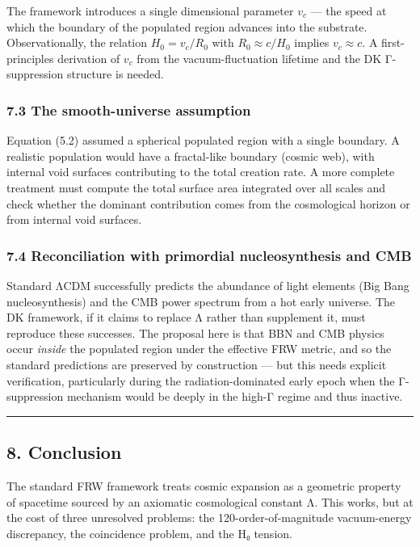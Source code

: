 \documentclass[
]{article}
\begin{document}
The framework introduces a single dimensional parameter \(v_c\) --- the
speed at which the boundary of the populated region advances into the
substrate. Observationally, the relation \(H_0 = v_c / R_0\) with
\(R_0 \approx c/H_0\) implies \(v_c \approx c\). A first-principles
derivation of \(v_c\) from the vacuum-fluctuation lifetime and the DK
Γ-suppression structure is needed.

\subsubsection{7.3 The smooth-universe
assumption}\label{the-smooth-universe-assumption}

Equation (5.2) assumed a spherical populated region with a single
boundary. A realistic population would have a fractal-like boundary
(cosmic web), with internal void surfaces contributing to the total
creation rate. A more complete treatment must compute the total surface
area integrated over all scales and check whether the dominant
contribution comes from the cosmological horizon or from internal void
surfaces.

\subsubsection{7.4 Reconciliation with primordial nucleosynthesis and
CMB}\label{reconciliation-with-primordial-nucleosynthesis-and-cmb}

Standard ΛCDM successfully predicts the abundance of light elements (Big
Bang nucleosynthesis) and the CMB power spectrum from a hot early
universe. The DK framework, if it claims to replace Λ rather than
supplement it, must reproduce these successes. The proposal here is that
BBN and CMB physics occur \emph{inside} the populated region under the
effective FRW metric, and so the standard predictions are preserved by
construction --- but this needs explicit verification, particularly
during the radiation-dominated early epoch when the Γ-suppression
mechanism would be deeply in the high-Γ regime and thus inactive.

\begin{center}\rule{0.5\linewidth}{0.5pt}\end{center}

\subsection{8. Conclusion}\label{conclusion}

The standard FRW framework treats cosmic expansion as a geometric
property of spacetime sourced by an axiomatic cosmological constant Λ.
This works, but at the cost of three unresolved problems: the
120-order-of-magnitude vacuum-energy discrepancy, the coincidence
problem, and the H₀ tension.
\end{document}
